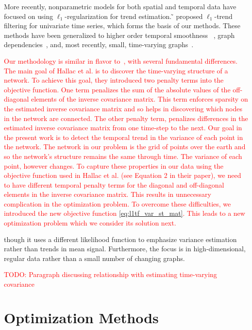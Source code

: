 \documentclass[letterpaper]{article} %
\newcommand{\citet}[1]
{\citeauthor{#1} ̃\shortcite{#1}}
\newcommand{\attn}[1]{\textcolor{red}{TODO: #1}}
\begin{document}
More recently, nonparametric models for both spatial and temporal data
have focused on using $\ell_1$-regularization for trend
estimation. \citet{KimKoh2009} proposed $\ell_1$-trend filtering for
univariate time series, which forms the basis of our methods. These
methods have been generalized to higher order temporal smoothness
~\cite{Tibshirani2014}, graph dependencies~\cite{WangSharpnack2016},
and, most recently, small, time-varying
graphs~\cite{HallacPark2017}. 

\textcolor{red}{Our methodology is similar in flavor to~\cite{HallacPark2017}, with several fundamental differences. The main goal of Hallac et al. is to discover the time-varying structure of a network. To achieve this goal, they introduced two penalty terms into the objective function. One term penalizes the sum of the absolute values of the off-diagonal elements of the inverse covariance matrix. This term enforces sparsity on the estimated inverse covariance matrix and so helps in discovering which nodes in the network are connected. The other penalty term, penalizes differences in the estimated inverse covariance matrix from one time-step to the next. Our goal in the present work is to detect the temporal trend in the variance of each point in the network. The network in our problem is the grid of points over the earth and so the network's structure remains the same through time. The variance of each point, however changes. To capture these properties in our data using the objective function used in Hallac et al. (see Equation 2 in their paper), we need to have different temporal penalty terms for the diagonal and off-diagonal elements in the inverse covariance matrix. This results in unnecessary complication in the optimization problem. To overcome these difficulties, we introduced the new objective function \ref{eq:l1tf_var_st_mat}. This leads to a new optimization problem which we consider its solution next.}

though it uses a different likelihood
function to emphasize variance estimation rather than trends in mean
signal. Furthermore, the focus is in high-dimensional, regular data
rather than a small number of changing graphs.

\attn{Paragraph discussing relationship with estimating time-varying covariance}

\section{Optimization Methods}
\label{sec:prop-optim-meth}
\end{document}
